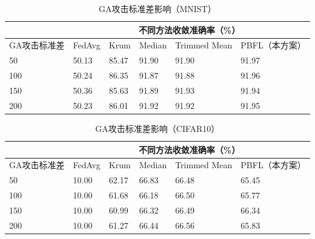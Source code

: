 \begin{table}[]
		\centering 	
		\caption{GA攻击标准差影响（MNIST）}
		\label{mnist-std-ga}
	\begin{tabular}{l|lllll} 
		\toprule \multicolumn{1}{c|}{}         & \multicolumn{5}{c}{不同方法收敛准确率（\%）}                                                                                                      \\ \midrule \multicolumn{1}{c|}{GA攻击标准差} & \multicolumn{1}{l|}{FedAvg} & \multicolumn{1}{l|}{Krum}  & \multicolumn{1}{l|}{Median} & \multicolumn{1}{l|}{Trimmed Mean} & PBFL（本方案） \\ \hline 50                            & \multicolumn{1}{l|}{50.13}  & \multicolumn{1}{l|}{85.47} & \multicolumn{1}{l|}{91.90}  & \multicolumn{1}{l|}{91.90}        & 91.97     \\ \hline 100                           & \multicolumn{1}{l|}{50.24}  & \multicolumn{1}{l|}{86.35} & \multicolumn{1}{l|}{91.87}  & \multicolumn{1}{l|}{91.88}        & 91.96     \\ \hline 150                           & \multicolumn{1}{l|}{50.36}  & \multicolumn{1}{l|}{85.63} & \multicolumn{1}{l|}{91.89}  & \multicolumn{1}{l|}{91.93}        & 91.94     \\ \hline 200                           & \multicolumn{1}{l|}{50.23}  & \multicolumn{1}{l|}{86.01} & \multicolumn{1}{l|}{91.92}  & \multicolumn{1}{l|}{91.92}        & 91.95     \\ \bottomrule 
	\end{tabular}
\end{table}

\begin{table}[] 
	\centering 	 		\caption{GA攻击标准差影响（CIFAR10）} 		\label{cifar-std-ga}
	\begin{tabular}{l|lllll} \toprule \multicolumn{1}{c|}{}         & \multicolumn{5}{c}{不同方法收敛准确率（\%）}                                                                                                      \\ \midrule \multicolumn{1}{c|}{GA攻击标准差} & \multicolumn{1}{l|}{FedAvg} & \multicolumn{1}{l|}{Krum}  & \multicolumn{1}{l|}{Median} & \multicolumn{1}{l|}{Trimmed Mean} & PBFL（本方案） \\ \hline 50                            & \multicolumn{1}{l|}{10.00}  & \multicolumn{1}{l|}{62.17} & \multicolumn{1}{l|}{66.83}  & \multicolumn{1}{l|}{66.48}        & 65.45     \\ \hline 100                           & \multicolumn{1}{l|}{10.00}  & \multicolumn{1}{l|}{61.68} & \multicolumn{1}{l|}{66.18}  & \multicolumn{1}{l|}{66.50}        & 65.77     \\ \hline 150                           & \multicolumn{1}{l|}{10.00}  & \multicolumn{1}{l|}{60.99} & \multicolumn{1}{l|}{66.32}  & \multicolumn{1}{l|}{66.49}        & 66.34     \\ \hline 200                           & \multicolumn{1}{l|}{10.00}  & \multicolumn{1}{l|}{61.27} & \multicolumn{1}{l|}{66.44}  & \multicolumn{1}{l|}{66.56}        & 65.83     \\ \bottomrule \end{tabular} \end{table}

